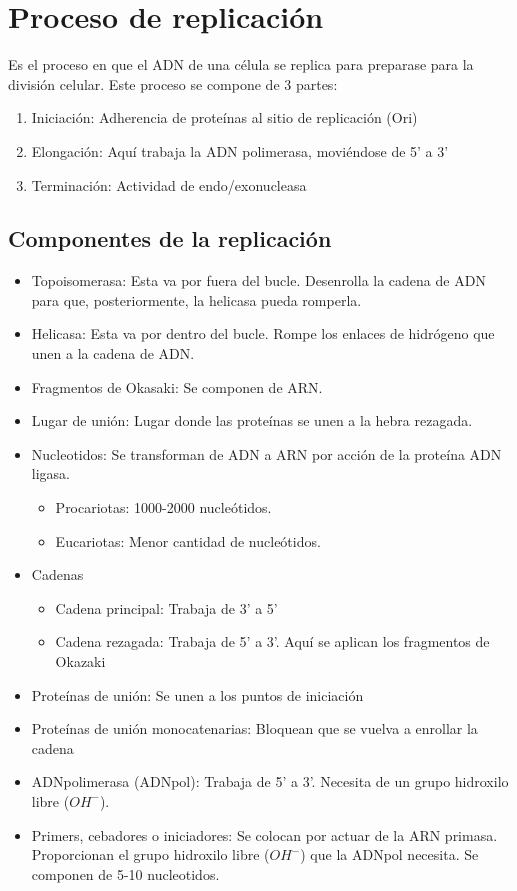 \section{Proceso de replicación} %

Es el proceso en que el ADN de una célula se replica para preparase para la división celular. Este proceso se compone de 3 partes:

\begin{enumerate}
    \item Iniciación: Adherencia de proteínas al sitio de replicación (Ori)
    \item Elongación: Aquí trabaja la ADN polimerasa, moviéndose de 5' a 3'
    \item Terminación: Actividad de endo/exonucleasa
\end{enumerate}

\subsection{Componentes de la replicación}

\begin{itemize}
    \item Topoisomerasa: Esta va  por fuera del bucle. Desenrolla la cadena de ADN para que, posteriormente, la helicasa pueda romperla.
    \item Helicasa: Esta va por dentro del bucle. Rompe los enlaces de hidrógeno que unen a la cadena de ADN.
    \item Fragmentos de Okasaki: Se componen de ARN.
    \item Lugar de unión: Lugar donde las proteínas se unen a la hebra rezagada.
    \item Nucleotidos: Se transforman de ADN a ARN por acción de la proteína ADN ligasa. 
        \begin{itemize}
            \item Procariotas: 1000-2000 nucleótidos.
            \item Eucariotas: Menor cantidad de nucleótidos.
        \end{itemize}
        
    \item Cadenas
        \begin{itemize}
            \item Cadena principal: Trabaja de 3' a 5'
            \item Cadena rezagada: Trabaja de 5' a 3'. Aquí se aplican los fragmentos de Okazaki
        \end{itemize}
    \item Proteínas de unión: Se unen a los puntos de iniciación
    \item Proteínas de unión monocatenarias: Bloquean que se vuelva a enrollar la cadena
    \item ADNpolimerasa (ADNpol): Trabaja de 5' a 3'. Necesita de un grupo hidroxilo libre ($OH^{-}$).
    \item Primers, cebadores o iniciadores: Se colocan por actuar de la ARN primasa. Proporcionan el grupo hidroxilo libre ($OH^{-}$) que la ADNpol necesita. Se componen de 5-10 nucleotidos.
\end{itemize}

